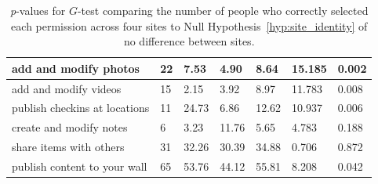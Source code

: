 \documentclass{sig-alternate}
\begin{document}
\begin{table}[htpb]
\begin{tabular}{|l|l|l|l|l|l|l|}
    add and modify photos                & 22                                                          & 7.53                                                            & 4.90                                                         & 8.64                                                       & 15.185                                                                               & 0.002                             \\ \hline
    add and modify videos                & 15                                                          & 2.15                                                            & 3.92                                                         & 8.97                                                       & 11.783                                                                               & 0.008                             \\ \hline
    publish checkins at locations        & 11                                                          & 24.73                                                           & 6.86                                                         & 12.62                                                      & 10.937                                                                               & 0.006                             \\ \hline
    create and modify notes              & 6                                                           & 3.23                                                            & 11.76                                                        & 5.65                                                       & 4.783                                                                                & 0.188                             \\ \hline
    share items with others              & 31                                                          & 32.26                                                           & 30.39                                                        & 34.88                                                      & 0.706                                                                                & 0.872                             \\ \hline
    publish content to your wall         & 65                                                          & 53.76                                                           & 44.12                                                        & 55.81                                                      &    8.208                                                                                  & 0.042                             \\ \hline
  \end{tabular}
  \caption{\emph{p}-values for $G$-test comparing the number of people who correctly selected each permission across four sites to Null Hypothesis~\ref{hyp:site_identity} of no difference between sites.}
  \label{table:multistats}
\end{table}
\end{document}
